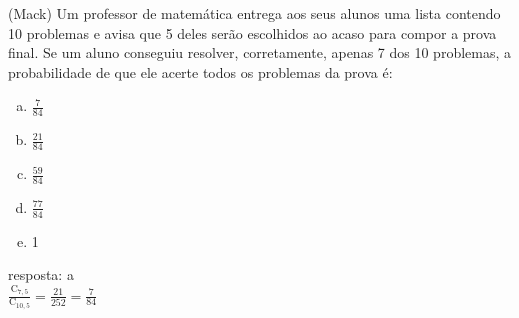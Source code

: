 \begin{ex}
  (Mack) Um professor de matemática entrega aos seus alunos uma lista contendo 10 problemas e avisa que 5 deles serão escolhidos ao acaso para compor a prova final. Se um aluno conseguiu resolver, corretamente, apenas 7 dos 10 problemas, a probabilidade de que ele acerte todos os problemas da prova é:
    \begin{enumerate}  [(a)]
        \item $\frac{7}{84}$
        \item $\frac{21}{84}$
        \item $\frac{59}{84}$
        \item $\frac{77}{84}$
        \item 1
    \end{enumerate}
      \begin{sol}
       resposta: a\\
       $\frac{\mathrm{C}_{7,5}}{\mathrm{C}_{{10,5}}}=\frac{21}{252}=\frac{7}{84}$
      \end{sol}
 \end{ex}